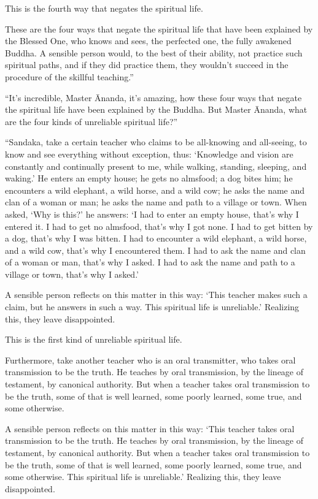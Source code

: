\documentclass[12pt,openany]{book}%
\begin{document}
This is the fourth way that negates the spiritual life. 

These are the four ways that negate the spiritual life that have been explained by the Blessed One, who knows and sees, the perfected one, the fully awakened Buddha. A sensible person would, to the best of their ability, not practice such spiritual paths, and if they did practice them, they wouldn’t succeed in the procedure of the skillful teaching.” 

“It’s incredible, Master Ānanda, it’s amazing, how these four ways that negate the spiritual life have been explained by the Buddha. But Master Ānanda, what are the four kinds of unreliable spiritual life?” 

“Sandaka, take a certain teacher who claims to be all-knowing and all-seeing, to know and see everything without exception, thus: ‘Knowledge and vision are constantly and continually present to me, while walking, standing, sleeping, and waking.’ He enters an empty house; he gets no almsfood; a dog bites him; he encounters a wild elephant, a wild horse, and a wild cow; he asks the name and clan of a woman or man; he asks the name and path to a village or town. When asked, ‘Why is this?’ he answers: ‘I had to enter an empty house, that’s why I entered it. I had to get no almsfood, that’s why I got none. I had to get bitten by a dog, that’s why I was bitten. I had to encounter a wild elephant, a wild horse, and a wild cow, that’s why I encountered them. I had to ask the name and clan of a woman or man, that’s why I asked. I had to ask the name and path to a village or town, that’s why I asked.’ 

A sensible person reflects on this matter in this way: ‘This teacher makes such a claim, but he answers in such a way. This spiritual life is unreliable.’ Realizing this, they leave disappointed. 

This is the first kind of unreliable spiritual life. 

Furthermore, take another teacher who is an oral transmitter, who takes oral transmission to be the truth. He teaches by oral transmission, by the lineage of testament, by canonical authority. But when a teacher takes oral transmission to be the truth, some of that is well learned, some poorly learned, some true, and some otherwise. 

A sensible person reflects on this matter in this way: ‘This teacher takes oral transmission to be the truth. He teaches by oral transmission, by the lineage of testament, by canonical authority. But when a teacher takes oral transmission to be the truth, some of that is well learned, some poorly learned, some true, and some otherwise. This spiritual life is unreliable.’ Realizing this, they leave disappointed. 
\end{document}
